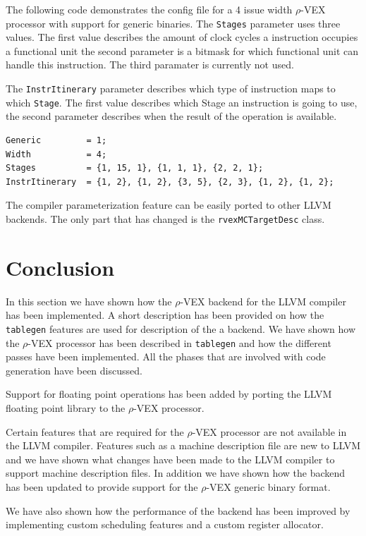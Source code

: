 The following code demonstrates the config file for a 4 issue width  $\rho$-VEX processor with support for generic binaries. The \texttt{Stages} parameter uses three values. The first value describes the amount of clock cycles a instruction occupies a functional unit the second parameter is a bitmask for which functional unit can handle this instruction. The third paramater is currently not used.

The \texttt{InstrItinerary} parameter describes which type of instruction maps to which \texttt{Stage}. The first value describes which Stage an instruction is going to use, the second parameter describes when the result of the operation is available.

\begin{lstlisting}[language=config]
Generic         = 1;
Width           = 4; 
Stages          = {1, 15, 1}, {1, 1, 1}, {2, 2, 1};
InstrItinerary  = {1, 2}, {1, 2}, {3, 5}, {2, 3}, {1, 2}, {1, 2};
\end{lstlisting}

The compiler parameterization feature can be easily ported to other LLVM backends. The only part that has changed is the \texttt{rvexMCTargetDesc} class. 

\section{Conclusion}
In this section we have shown how the $\rho$-VEX backend for the LLVM compiler has been implemented. A short description has been provided on how the \texttt{tablegen} features are used for description of the a backend. We have shown how the $\rho$-VEX processor has been described in \texttt{tablegen} and how the different passes have been implemented. All the phases that are involved with code generation have been discussed.

Support for floating point operations has been added by porting the LLVM floating point library to the $\rho$-VEX processor.

Certain features that are required for the $\rho$-VEX processor are not available in the LLVM compiler. Features such as a machine description file are new to LLVM and we have shown what changes have been made to the LLVM compiler to support machine description files. In addition we have shown how the backend has been updated to provide support for the $\rho$-VEX generic binary format.

We have also shown how the performance of the backend has been improved by implementing custom scheduling features and a custom register allocator.


\acresetall
